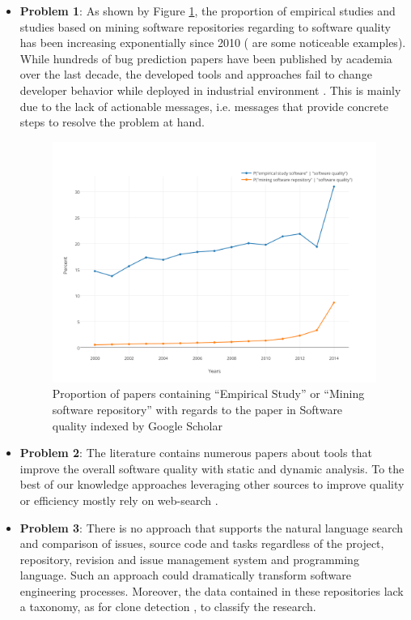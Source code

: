 \begin{itemize}
	\item {\bf Problem 1}: As shown by Figure \ref{fig:scholar}, the proportion of empirical studies and studies based on mining software repositories regarding to software quality has been increasing exponentially since 2010 (\cite{Kim2011a,Lee2011a,Sun2011,Bhattacharya2011,Tian2012a,Zimmermann2012, Shang2013, Chen2014, McIntosh, Hemmati2015} are some noticeable examples).
	While hundreds of bug prediction papers have been published by academia over the last decade, the developed tools and approaches fail to change developer behavior while deployed in industrial environment	\cite{Lewis2013}.
	This is mainly due to the lack of actionable messages, i.e. messages that provide concrete steps to resolve the problem at hand.

	\begin{figure}[h!]
	  \centering
	  	    \includegraphics[scale=0.7]{media/scholar.png}
	    \caption{Proportion of papers containing ``Empirical Study'' or ``Mining software repository'' with regards to the paper in Software quality indexed by Google Scholar	\label{fig:scholar}}
	\end{figure}

	\item {\bf Problem 2}: The literature contains numerous papers about tools that improve the overall software quality with static \cite{Dangel2000, burn2003checkstyle, Hovemeyer2007, Moha2010} and dynamic \cite{Nayrolles,Nayrolles2013a,Palma2013} analysis. To the best of our knowledge approaches leveraging other sources to improve quality or efficiency mostly rely on web-search \cite{Brandt2009,Rahman2013,Montandon2013}.

	\item {\bf Problem 3}: There is no approach that supports the natural language search and comparison of issues, source code and tasks regardless of the project, repository, revision and issue management system and programming language. Such an approach could dramatically transform software engineering processes. Moreover, the data contained in these repositories lack a taxonomy, as for clone detection \cite{CoryKapser}, to classify the research.
\end{itemize}

